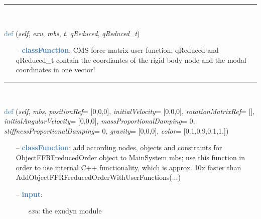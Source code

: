 \begin{itemize}[leftmargin=1.4cm]
\begin{itemize}[leftmargin=1.4cm]
\begin{itemize}[leftmargin=0.5cm]
\begin{itemize}[leftmargin=1.4cm]
\begin{itemize}[leftmargin=1.4cm]
\begin{itemize}[leftmargin=0.5cm]
\begin{itemize}[leftmargin=0.7cm]
\vspace{12pt}\end{itemize}
%
\noindent\rule{8cm}{0.75pt}\vspace{1pt} \\ 
\begin{flushleft}
\noindent \textcolor{steelblue}{def {\bf {}}}\label{sec:FEM:ObjectFFRFreducedOrderInterface:UFforceFFRFreducedOrder}
({\it self}, {\it exu}, {\it mbs}, {\it t}, {\it qReduced}, {\it qReduced\_t})
\end{flushleft}
\setlength{\itemindent}{0.7cm}
\begin{itemize}[leftmargin=0.7cm]
\item[--]\textcolor{steelblue}{\bf classFunction}: CMS force matrix user function; qReduced and qReduced\_t contain the coordiantes of the rigid body node and the modal coordinates in one vector!
\vspace{12pt}\end{itemize}
%
\noindent\rule{8cm}{0.75pt}\vspace{1pt} \\ 
\begin{flushleft}
\noindent \textcolor{steelblue}{def {\bf {}}}\label{sec:FEM:ObjectFFRFreducedOrderInterface:AddObjectFFRFreducedOrder}
({\it self}, {\it mbs}, {\it positionRef}= [0,0,0], {\it initialVelocity}= [0,0,0], {\it rotationMatrixRef}= [], {\it initialAngularVelocity}= [0,0,0], {\it massProportionalDamping}= 0, {\it stiffnessProportionalDamping}= 0, {\it gravity}= [0,0,0], {\it color}= [0.1,0.9,0.1,1.])
\end{flushleft}
\setlength{\itemindent}{0.7cm}
\begin{itemize}[leftmargin=0.7cm]
\item[--]\textcolor{steelblue}{\bf classFunction}: add according nodes, objects and constraints for ObjectFFRFreducedOrder object to MainSystem mbs; use this function in order to use internal C++ functionality, which is approx. 10x faster than AddObjectFFRFreducedOrderWithUserFunctions(...)
\item[--]\textcolor{steelblue}{\bf input}: \vspace{-6pt}
\begin{itemize}[leftmargin=1.2cm]
\setlength{\itemindent}{-0.7cm}
\item[]{\it exu}: the exudyn module

\end{itemize}
\end{itemize}
\end{itemize}
\end{itemize}
\end{itemize}
\end{itemize}
\end{itemize}
\end{itemize}
